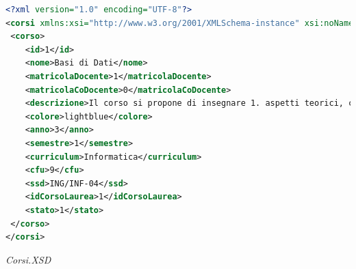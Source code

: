 \documentclass [a4paper,11pt]{book}
\begin{document}
\begin{lstlisting}[language=XML]
<?xml version="1.0" encoding="UTF-8"?>
<corsi xmlns:xsi="http://www.w3.org/2001/XMLSchema-instance" xsi:noNamespaceSchemaLocation="corsi.xsd">
 <corso>
    <id>1</id>
    <nome>Basi di Dati</nome>
    <matricolaDocente>1</matricolaDocente>
    <matricolaCoDocente>0</matricolaCoDocente>
    <descrizione>Il corso si propone di insegnare 1. aspetti teorici, consistenti in modelli e linguaggi di basi di dati, 2. metodologie di progetto, che consentiranno allo studente, una volta che siano acquisite, di affrontare e risolvere casi concreti, 3. tecnologie, consistenti in diversi strumenti software usati in modo combinato per la implementazione delle basi di dati, scegliendo strumenti diffusi nelle pratiche aziendali. Alla fine del corso lo studente sara in grado di interagire con il destinatario di una applicazione di basi di dati in modo da sintetizzare correttamente i requisiti e di sviluppare prima il progetto, poi la applicazione stessa, scegliendo gli strumenti piu idonei.</descrizione>
    <colore>lightblue</colore>
    <anno>3</anno>
    <semestre>1</semestre>
    <curriculum>Informatica</curriculum>
    <cfu>9</cfu>
    <ssd>ING/INF-04</ssd>
    <idCorsoLaurea>1</idCorsoLaurea>
    <stato>1</stato>
 </corso>
</corsi>
\end{lstlisting}

\medskip

\emph{Corsi.XSD}
\end{document}
